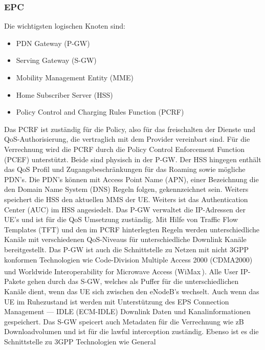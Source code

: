 \subsubsection{EPC}
\label{subsubsec:epc}
Die wichtigsten logischen Knoten sind:
\begin{itemize}
	\item PDN Gateway (P-GW)
	\item Serving Gateway (S-GW)
	\item Mobility Management Entity (MME)
	\item Home Subscriber Server (HSS)
	\item Policy Control and Charging Rules Function (PCRF)
\end{itemize}
Das PCRF ist zuständig für die Policy, also für das freischalten der Dienste und QoS-Authorisierung, die vertraglich mit dem Provider vereinbart sind. Für die Verrechnung wird die PCRF durch die Policy Control Enforcement Function (PCEF) unterstützt. Beide sind physisch in der P-GW. Der HSS hingegen enthält das QoS Profil und Zugangsbeschränkungen für das Roaming sowie mögliche PDN's. Die PDN's können mit Access Point Name (APN), einer Bezeichnung die den Domain Name System (DNS) Regeln folgen, gekennzeichnet sein. Weiters speichert die HSS den aktuellen MMS der UE. Weiters ist das Authentication Center (AUC) im HSS angesiedelt. Das P-GW verwaltet die IP-Adressen der UE's und ist für die QoS Umsetzung zuständig. Mit Hilfe von Traffic Flow Templates (TFT) und den im PCRF hinterlegten Regeln werden unterschiedliche Kanäle mit verschiedenen QoS-Niveaus für unterschiedliche Downlink Kanäle bereitgestellt. Das P-GW ist auch die Schnittstelle zu Netzen mit nicht 3GPP konformen Technologien wie Code-Division Multiple Access 2000 (CDMA2000) und Worldwide Interoperability for Microwave Access (WiMax\,\textsuperscript{\tiny\textregistered}). Alle User IP-Pakete gehen durch das S-GW, welches als Puffer für die unterschiedlichen Kanäle dient, wenn das UE sich zwischen den eNodeB's wechselt. Auch wenn das UE im Ruhezustand ist werden mit Unterstützung des EPS Connection Management — IDLE (ECM-IDLE)  Downlink Daten und Kanalinformationen gespeichert. Das S-GW speicert auch Metadaten für die Verrechnung wie zB Downloadvolumen und ist für die lawful interception zuständig. Ebenso ist es die Schnittstelle zu 3GPP Technologien wie General
